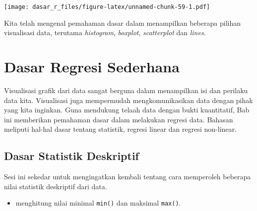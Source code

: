\documentclass[
  12pt,
  a4paper,
]{scrbook}
\newenvironment{Shaded}{\begin{snugshade}}{\end{snugshade}}
\newcommand{\DataTypeTok}[1]{\textcolor[rgb]{0.13,0.29,0.53}{#1}}
\newcommand{\DecValTok}[1]{\textcolor[rgb]{0.00,0.00,0.81}{#1}}
\newcommand{\KeywordTok}[1]{\textcolor[rgb]{0.13,0.29,0.53}{\textbf{#1}}}
\newcommand{\NormalTok}[1]{#1}
\newcommand{\OperatorTok}[1]{\textcolor[rgb]{0.81,0.36,0.00}{\textbf{#1}}}
\newcommand{\StringTok}[1]{\textcolor[rgb]{0.31,0.60,0.02}{#1}}
\providecommand{\tightlist}{%
  \setlength{\itemsep}{0pt}\setlength{\parskip}{0pt}}
\begin{document}
\begin{Shaded}
\end{Shaded}

\texttt{[image: dasar\_r\_files/figure-latex/unnamed-chunk-59-1.pdf]}

Kita telah mengenal pemahaman dasar dalam menampilkan beberapa pilihan
visualisasi data, terutama \emph{histogram}, \emph{boxplot},
\emph{scatterplot} dan \emph{lines}.

\newpage

\hypertarget{dasar-regresi-sederhana}{%
\chapter{Dasar Regresi Sederhana}\label{dasar-regresi-sederhana}}

Visualisasi grafik dari data sangat berguna dalam menampilkan isi dan
perilaku data kita. Visualisasi juga mempermudah mengkomunikasikan data
dengan pihak yang kita inginkan. Guna mendukung telaah data dengan bukti
kuantitatif, Bab ini memberikan pemahaman dasar dalam melakukan regresi
data. Bahasan meliputi hal-hal dasar tentang statistik, regresi linear
dan regresi non-linear.

\hypertarget{dasar-statistik-deskriptif}{%
\section{Dasar Statistik Deskriptif}\label{dasar-statistik-deskriptif}}

Sesi ini sekedar untuk mengingatkan kembali tentang cara memperoleh
beberapa nilai statistik deskriptif dari data.

\begin{itemize}
\tightlist
\item
  menghitung nilai minimal \texttt{min()} dan maksimal \texttt{max()}.
\end{itemize}
\end{document}
